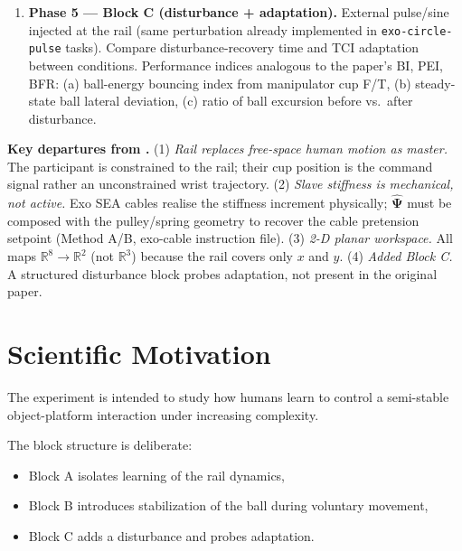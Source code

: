 \documentclass[11pt, a4paper]{article}
\begin{document}
\begin{actionbox}
\begin{enumerate}[nosep]
        Primary metric: ball dwell time / lateral deviation on manipulator.
  \item \textbf{Phase 5 --- Block C (disturbance + adaptation).}
        External pulse/sine injected at the rail (same perturbation already
        implemented in \texttt{exo-circle-pulse} tasks).  Compare
        disturbance-recovery time and TCI adaptation between conditions.
        Performance indices analogous to the paper's BI, PEI, BFR:
        (a) ball-energy bouncing index from manipulator cup F/T,
        (b) steady-state ball lateral deviation,
        (c) ratio of ball excursion before vs.\ after disturbance.
\end{enumerate}
\end{actionbox}

\begin{warnbox}
\textbf{Key departures from \citet{ajoudani2012icra}.}
(1) \emph{Rail replaces free-space human motion as master.}  The participant
is constrained to the rail; their cup position is the command signal rather
an unconstrained wrist trajectory.
(2) \emph{Slave stiffness is mechanical, not active.}  Exo SEA cables
realise the stiffness increment physically; \(\hat{\boldsymbol\Psi}\) must be
composed with the pulley/spring geometry to recover the cable pretension
setpoint (Method A/B, exo-cable instruction file).
(3) \emph{2-D planar workspace.} All maps
\(\mathbb{R}^8\!\to\!\mathbb{R}^2\) (not \(\mathbb{R}^3\)) because the rail
covers only \(x\) and \(y\).
(4) \emph{Added Block C.}  A structured disturbance block probes adaptation,
not present in the original paper.
\end{warnbox}

\section{Scientific Motivation}

The experiment is intended to study how humans learn to control a semi-stable object-platform interaction under increasing complexity.

The block structure is deliberate:

\begin{itemize}[nosep]
  \item Block A isolates learning of the rail dynamics,
  \item Block B introduces stabilization of the ball during voluntary movement,
  \item Block C adds a disturbance and probes adaptation.
\end{itemize}
\end{document}
